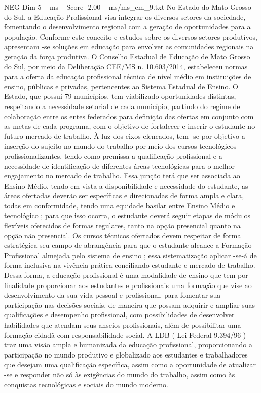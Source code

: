 \begin{textsample}{NEG Dim 5 – ms – Score -2.00 – ms/ms\_em\_9.txt}
No Estado do Mato Grosso do Sul, a Educação Profissional visa integrar os diversos setores da sociedade, fomentando o desenvolvimento regional com a geração de oportunidades para a população.
Conforme este conceito e estudos sobre os diversos setores produtivos, apresentam -se soluções em educação para envolver as comunidades regionais na geração da força produtiva.
O Conselho Estadual de Educação de Mato Grosso do Sul, por meio da Deliberação CEE/MS n. 10.603/2014, estabeleceu normas para a oferta da educação profissional técnica de nível médio em instituições de ensino, públicas e privadas, pertencentes ao Sistema Estadual de Ensino.
O Estado, que possui 79 municípios, tem viabilizado oportunidades distintas, respeitando a necessidade setorial de cada município, partindo do regime de colaboração entre os entes federados para definição das ofertas em conjunto com as metas de cada programa, com o objetivo de fortalecer e inserir o estudante no futuro mercado de trabalho.
À luz dos eixos elencados, tem -se por objetivo a inserção do sujeito no mundo do trabalho por meio dos cursos tecnológicos profissionalizantes, tendo como premissa a qualificação profissional e a necessidade de identificação de diferentes áreas tecnológicas para o melhor engajamento no mercado de trabalho.
Essa junção terá que ser associada ao Ensino Médio, tendo em vista a disponibilidade e necessidade do estudante, as áreas ofertadas deverão ser específicas e direcionadas de forma ampla e clara, todas em conformidade, tendo uma equidade basilar entre Ensino Médio e tecnológico ; para que isso ocorra, o estudante deverá seguir etapas de módulos flexíveis oferecidos de formas regulares, tanto na opção presencial quanto na opção não presencial.
Os cursos técnicos ofertados devem respeitar de forma estratégica seu campo de abrangência para que o estudante alcance a Formação Profissional almejada pelo sistema de ensino ; essa sistematização aplicar -se-á de forma inclusiva na vivência prática conciliando estudante e mercado de trabalho.
Dessa forma, a educação profissional é uma modalidade de ensino que tem por finalidade proporcionar aos estudantes e profissionais uma formação que vise ao desenvolvimento da sua vida pessoal e profissional, para fomentar sua participação nas decisões sociais, de maneira que possam adquirir e ampliar suas qualificações e desempenho profissional, com possibilidades de desenvolver habilidades que atendam seus anseios profissionais, além de possibilitar uma formação cidadã com responsabilidade social.
A LDB ( Lei Federal 9.394/96 ) traz uma visão ampla e humanizada da educação profissional, proporcionando a participação no mundo produtivo e globalizado aos estudantes e trabalhadores que desejam uma qualificação específica, assim como a oportunidade de atualizar -se e responder não só às exigências do mundo do trabalho, assim como às conquistas tecnológicas e sociais do mundo moderno.

\end{textsample}

